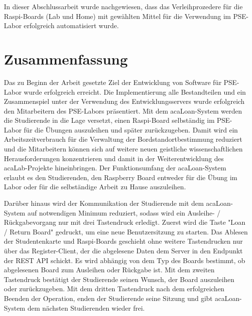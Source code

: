 In dieser Abschlussarbeit wurde nachgewiesen, dass das Verleihprozedere für die Raspi-Boards (Lab und Home) mit gewählten Mittel für die Verwendung im PSE-Labor erfolgreich automatisiert wurde. 

\chapter{Zusammenfassung}
\label{sec:results}
Das zu Beginn der Arbeit gesetzte Ziel der Entwicklung von Software für PSE-Labor wurde erfolgreich erreicht. Die Implementierung alle Bestandteilen und ein Zusammenspiel unter der Verwendung des Entwicklungsservers wurde erfolgreich den Mitarbeitern des PSE-Labors präsentiert. Mit dem acaLoan-System werden die Studierende in die Lage versetzt, einen Raspi-Board selbständig im PSE-Labor für die Übungen auszuleihen und später zurückzugeben. Damit wird ein Arbeitszeitverbrauch für die Verwaltung der Bordstandortbestimmung reduziert und die Mitarbeitern können sich auf weitere neuen geistliche wissenschaftlichen Herausforderungen konzentrieren und damit in der Weiterentwicklung des acaLab-Projekte hineinbringen.  Der Funktionsumfang der acaLoan-System erlaubt es den Studierenden, den Raspberry Board entweder für die Übung im Labor oder für die selbständige Arbeit zu Hause auszuleihen. 

Darüber hinaus wird der Kommunikation der Studierende mit dem acaLoan-System auf notwendigen Minimum reduziert, sodass wird ein Ausleihe- / Rückgabevorgang nur mit drei Tastendruck erledigt. Zuerst wird die Taste "Loan / Return Board" gedruckt, um eine neue Benutzersitzung zu starten. Das Ablesen der Studentenkarte und Raspi-Boards geschieht ohne weitere Tastendrucken nur über das Register-Client, der die abgelesene Daten dem Server in den Endpunkt der REST API schickt. Es wird abhängig von dem Typ des Boards bestimmt, ob abgelesenen Board zum Ausleihen oder Rückgabe ist. Mit dem zweiten Tastendruck bestätigt der Studierende seinen Wunsch, der Board auszuleihen oder zurückzugeben. Mit dem dritten Tastendruck nach dem erfolgreichen Beenden der Operation, enden der Studierende seine Sitzung und gibt acaLoan-System dem nächsten Studierenden wieder frei. 

